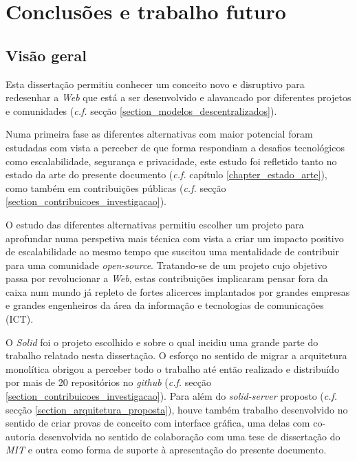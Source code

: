 
\chapter{Conclusões e trabalho futuro}
\label{cap:7}

\section{Visão geral}

Esta dissertação permitiu conhecer um conceito novo e disruptivo para redesenhar a \emph{Web} que está a ser desenvolvido e alavancado por diferentes projetos e comunidades (\emph{c.f.} secção \ref{section_modelos_descentralizados}).

Numa primeira fase as diferentes alternativas com maior potencial foram estudadas com vista a perceber de que forma respondiam a desafios tecnológicos como escalabilidade, segurança e privacidade, este estudo foi refletido tanto no estado da arte do presente documento (\emph{c.f.} capítulo \ref{chapter_estado_arte}), como também em contribuições públicas (\emph{c.f.} secção \ref{section_contribuicoes_investigacao}).

O estudo das diferentes alternativas permitiu escolher um projeto para aprofundar numa perspetiva mais técnica com vista a criar um impacto positivo de escalabilidade ao mesmo tempo que suscitou uma mentalidade de contribuir para uma comunidade \emph{open-source}. Tratando-se de um projeto cujo objetivo passa por revolucionar a \emph{Web}, estas contribuições implicaram pensar fora da caixa num mundo já repleto de fortes alicerces implantados por grandes empresas e grandes engenheiros da área da informação e tecnologias de comunicações (ICT).

O \emph{Solid} foi o projeto escolhido e sobre o qual incidiu uma grande parte do trabalho relatado nesta dissertação. O esforço no sentido de migrar a arquitetura monolítica obrigou a perceber todo o trabalho até então realizado e distribuído por mais de 20 repositórios no \emph{github} (\emph{c.f.} secção \ref{section_contribuicoes_investigacao}). Para além do \emph{solid-server} proposto (\emph{c.f.} secção \ref{section_arquitetura_proposta}), houve também trabalho desenvolvido no sentido de criar provas de conceito com interface gráfica, uma delas com co-autoria desenvolvida no sentido de colaboração com uma tese de dissertação do \emph{\acrshort{MIT}} e outra como forma de suporte à apresentação do presente documento.

